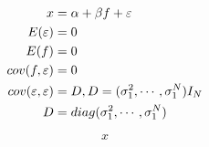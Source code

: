 \documentclass[10pt]{book}
\begin{document}
\begin{mdSnippets}
\begin{mdDisplaySnippet}[45f2c0da8a57edcabcc97e5a1f1e04ec]%
\[%
\begin{aligned}
x &= \alpha+\beta f+\varepsilon  \\ 
E(\varepsilon) &= 0\\ 
E(f)&= 0\\ 
 cov(f,\varepsilon)&=0 \\ 
 cov(\varepsilon,\varepsilon)&= D,D=(\sigma_1^2,\cdots ,\sigma_1^N)I_N\\ 
 D&= diag(\sigma_1^2,\cdots ,\sigma_1^N)
\end{flalign}
\]%
\end{mdDisplaySnippet}%
\begin{mdDisplaySnippet}[9dd4e461268c8034f5c8564e155c67a6]%
\[%
x
\]%
\end{mdDisplaySnippet}%

\end{mdSnippets}
\end{document}
